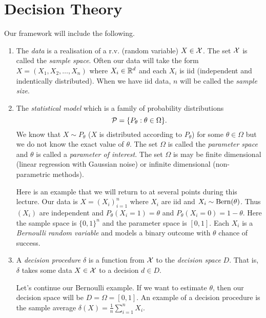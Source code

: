 \section{Decision Theory}
Our framework will include the following.
\begin{enumerate}
    \item The \emph{data} is a realisation of a r.v. (random variable) $X \in {\mathcal{X}}$. The set ${\mathcal{X}}$ is called the \emph{sample space}. Often our data will take the form $X = (X_1, X_2, \ldots, X_n)$ where $X_i \in {\mathbb R}^d$ and each $X_i$ is iid (independent and indentically distributed). When we have iid data, $n$ will be called the \emph{sample size}.
    \item The \emph{statistical model} which is a family of probability distributions
    \[{\mathcal{P}} = \{P_\theta : \theta \in \Omega\}. \]
    We know that $X \sim P_\theta$ ($X$ is distributed according to $P_\theta$) for some $\theta \in \Omega$ but we do not know the exact value of $\theta$. The set $\Omega$ is called the \emph{parameter space} and $\theta$ is called a \emph{parameter of interest}. The set $\Omega$ is may be finite dimensional (linear regression with Gaussian noise) or infinite dimensional (non-parametric methods).

    Here is an example that we will return to at several points during this lecture. Our data is $X = (X_i)_{i=1}^n$ where $X_i$ are iid and $X_i \sim \operatorname*{Bern}(\theta)$. Thus $(X_i)$ are independent and $P_\theta(X_i = 1) = \theta$ and $P_\theta(X_i = 0) = 1- \theta$. Here the sample space is $\{0,1\}^n$ and the parameter space is $[0,1]$. Each $X_i$ is a \emph{Bernoulli random variable} and models a binary outcome with $\theta$ chance of success.
    \item A \emph{decision procedure} $\delta$ is a function from ${\mathcal{X}}$ to the \emph{decision space} $D$. That is, $\delta$ takes some data $X \in {\mathcal{X}}$ to a decision $d \in D$. 
    
    Let's continue our Bernoulli example. If we want to estimate $\theta$, then our decision space will be $D = \Omega = [0,1]$. An example of a decision procedure is the sample average $\delta(X) = \frac{1}{n}\sum_{i=1}^n X_i$.


\end{enumerate}
